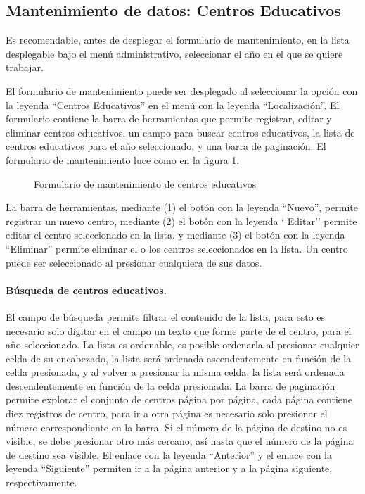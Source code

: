 \documentclass[a4paper, 9pt, conference]{article}              %
\begin{document}
\subsection{Mantenimiento de datos: Centros Educativos}
Es recomendable, antes de desplegar el formulario de mantenimiento, en la lista desplegable bajo el men\'u administrativo, seleccionar el a\~no en el que se quiere trabajar.

El formulario de mantenimiento puede ser desplegado al seleccionar la opci\'on con la leyenda ``Centros Educativos'' en el men\'u con la leyenda ``Localizaci\'on''. El formulario contiene la barra de herramientas que permite registrar, editar y eliminar centros educativos, un campo para buscar centros educativos, la lista de centros educativos para el a\~no seleccionado, y una barra de paginaci\'on. El formulario de mantenimiento luce como en la figura \ref{fig:geoschools}.

\begin{figure}
	\centering
		\caption{Formulario de mantenimiento de centros educativos}
	\label{fig:geoschools}
\end{figure}

La barra de herramientas, mediante (1) el bot\'on con la leyenda ``Nuevo'', permite registrar un nuevo centro, mediante (2) el bot\'on con la leyenda ` Editar'' permite editar el centro seleccionado en la lista, y mediante (3) el bot\'on con la leyenda ``Eliminar'' permite eliminar el o los centros seleccionados en la lista. Un centro puede ser seleccionado al presionar cualquiera de sus datos.

\paragraph{B\'usqueda de centros educativos.}

El campo de b\'usqueda permite filtrar el contenido de la lista, para esto es necesario solo digitar en el campo un texto que forme parte de el centro, para el a\~no seleccionado. La lista es ordenable, es posible ordenarla al presionar cualquier celda de su encabezado, la lista ser\'a ordenada ascendentemente en funci\'on de la celda presionada, y al volver a presionar la misma celda, la lista ser\'a ordenada descendentemente en funci\'on de la celda presionada. La barra de paginaci\'on permite explorar el conjunto de centros p\'agina por p\'agina, cada p\'agina contiene diez registros de centro, para ir a otra p\'agina es necesario solo presionar el n\'umero correspondiente en la barra. Si el n\'umero de la p\'agina de destino no es visible, se debe presionar otro m\'as cercano, as\'i hasta que el n\'umero de la p\'agina de destino sea visible. El enlace con la leyenda ``Anterior'' y el enlace con la leyenda ``Siguiente'' permiten ir a la p\'agina anterior y a la p\'agina siguiente, respectivamente.
\end{document}
